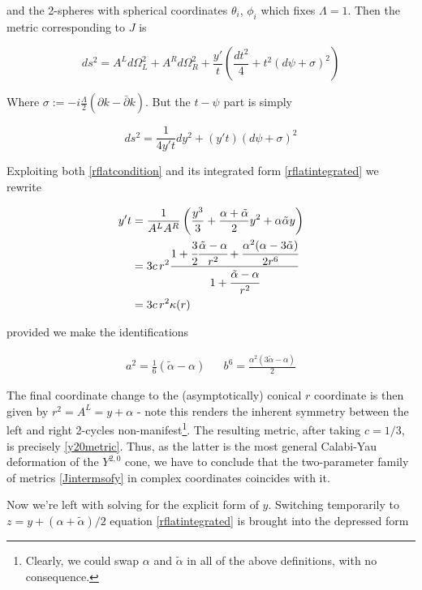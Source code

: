 and the 2-spheres with spherical coordinates $\theta_i$, $\phi_i$ which fixes $\Lambda = 1$. Then the metric corresponding to $J$ is

\begin{equation}
	ds^2 = A^L d\Omega^2_L + A^R d\Omega^2_R + \frac{y'}{t} \left( \frac{dt^2}{4} + t^2 (d\psi + \sigma)^2 \right)
\end{equation}

Where $\sigma := -i\frac{\Lambda}{2}(\partial k - \bar \partial k)$. But the $t-\psi$ part is simply

\begin{equation}
	ds^2 = \frac{1}{4y't} dy^2 + (y' t) (d\psi + \sigma)^2
\end{equation}

Exploiting both \eqref{rflatcondition} and its integrated form \eqref{rflatintegrated} we rewrite

\begin{align}
	y't & = \frac{1}{A^L A^R} \left( \frac{y^3}{3} + \frac{\alpha + \tilde{\alpha}}{2} y^2 + \alpha \tilde{\alpha} y \right)\\
	& = 3c\,r^2 \frac{1+ \cfrac{3}{2} \cfrac{\tilde{\alpha} - \alpha}{r^2} + \cfrac{\alpha^{2}(\alpha - 3 \tilde{\alpha})}{2r^6} }{1+ \cfrac{\tilde{\alpha} -\alpha}{r^2} }\\
	& = 3c\,r^2 \kappa(r)
\end{align}

provided we make the identifications

\begin{align}
	a^2 = \frac{1}{6}(\tilde{\alpha} - \alpha) && b^6 = \frac{\alpha^{2}(3\tilde{\alpha}-\alpha)}2
	\label{}
\end{align}

The final coordinate change to the (asymptotically) conical $r$ coordinate is then given by $r^2 = A^L = y + \alpha$ - note this renders the inherent symmetry between the left and right 2-cycles non-manifest\footnote{Clearly, we could swap $\alpha$ and $\tilde{\alpha}$ in all of the above definitions, with no consequence.}. The resulting metric, after taking $c=1/3$, is precisely \eqref{y20metric}. Thus, as the latter is the most general Calabi-Yau deformation of the $Y^{2,0}$ cone, we have to conclude that the two-parameter family of metrics \eqref{Jintermsofy} in complex coordinates coincides with it.

Now we're left with solving for the explicit form of $y$. Switching temporarily to $z = y + (\alpha + \tilde\alpha)/2$ equation \eqref{rflatintegrated} is brought into the depressed form

